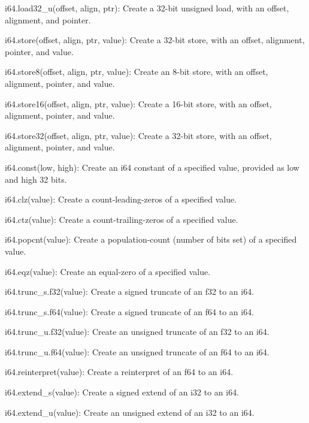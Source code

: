 \begin{DoxyItemize}
\begin{DoxyItemize}
\item {\ttfamily i64.\+load32\+\_\+u(offset, align, ptr)}\+: Create a 32-\/bit unsigned load, with an offset, alignment, and pointer.
\item {\ttfamily i64.\+store(offset, align, ptr, value)}\+: Create a 32-\/bit store, with an offset, alignment, pointer, and value.
\item {\ttfamily i64.\+store8(offset, align, ptr, value)}\+: Create an 8-\/bit store, with an offset, alignment, pointer, and value.
\item {\ttfamily i64.\+store16(offset, align, ptr, value)}\+: Create a 16-\/bit store, with an offset, alignment, pointer, and value.
\item {\ttfamily i64.\+store32(offset, align, ptr, value)}\+: Create a 32-\/bit store, with an offset, alignment, pointer, and value.
\item {\ttfamily i64.\+const(low, high)}\+: Create an {\ttfamily i64} constant of a specified value, provided as low and high 32 bits.
\item {\ttfamily i64.\+clz(value)}\+: Create a count-\/leading-\/zeros of a specified value.
\item {\ttfamily i64.\+ctz(value)}\+: Create a count-\/trailing-\/zeros of a specified value.
\item {\ttfamily i64.\+popcnt(value)}\+: Create a population-\/count (number of bits set) of a specified value.
\item {\ttfamily i64.\+eqz(value)}\+: Create an equal-\/zero of a specified value.
\item {\ttfamily i64.\+trunc\+\_\+s.\+f32(value)}\+: Create a signed truncate of an {\ttfamily f32} to an {\ttfamily i64}.
\item {\ttfamily i64.\+trunc\+\_\+s.\+f64(value)}\+: Create a signed truncate of an {\ttfamily f64} to an {\ttfamily i64}.
\item {\ttfamily i64.\+trunc\+\_\+u.\+f32(value)}\+: Create an unsigned truncate of an {\ttfamily f32} to an {\ttfamily i64}.
\item {\ttfamily i64.\+trunc\+\_\+u.\+f64(value)}\+: Create an unsigned truncate of an {\ttfamily f64} to an {\ttfamily i64}.
\item {\ttfamily i64.\+reinterpret(value)}\+: Create a reinterpret of an {\ttfamily f64} to an {\ttfamily i64}.
\item {\ttfamily i64.\+extend\+\_\+s(value)}\+: Create a signed extend of an {\ttfamily i32} to an {\ttfamily i64}.
\item {\ttfamily i64.\+extend\+\_\+u(value)}\+: Create an unsigned extend of an {\ttfamily i32} to an {\ttfamily i64}.

\end{DoxyItemize}
\end{DoxyItemize}
